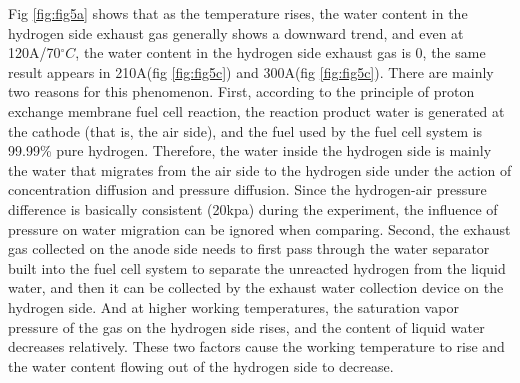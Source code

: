 
\par
Fig \ref{fig:fig5a} shows that as the temperature rises, the water content in the hydrogen side exhaust gas generally shows a downward trend, and even at 120A/70$^{\circ}C$, the water content in the hydrogen side exhaust gas is 0, the same result appears in 210A(fig \ref{fig:fig5c}) and 300A(fig \ref{fig:fig5c}). There are mainly two reasons for this phenomenon.  First, according to the principle of proton exchange membrane fuel cell reaction, the reaction product water is generated at the cathode (that is, the air side), and the fuel used by the fuel cell system is 99.99\% pure hydrogen. Therefore, the water inside the hydrogen side is mainly the water that migrates from the air side to the hydrogen side under the action of concentration diffusion and pressure diffusion. Since the hydrogen-air pressure difference is basically consistent (20kpa) during the experiment, the influence of pressure on water migration can be ignored when comparing. Second, the exhaust gas collected on the anode side needs to first pass through the water separator built into the fuel cell system to separate the unreacted hydrogen from the liquid water, and then it can be collected by the exhaust water collection device on the hydrogen side. And at higher working temperatures, the saturation vapor pressure of the gas on the hydrogen side rises, and the content of liquid water decreases relatively. These two factors cause the working temperature to rise and the water content flowing out of the hydrogen side to decrease.

